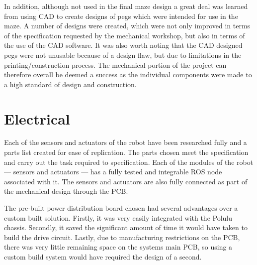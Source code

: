 In addition, although not used in the final maze design a great deal was learned from 
using CAD to create designs of pegs which were intended for use in the maze. A number 
of designs were created, which were not only improved in terms of the specification 
requested by the mechanical workshop, but also in terms of the use of the CAD 
software. It was also worth noting that the CAD designed pegs were not unusable 
because of a design flaw, but due to limitations in the printing/construction process. 
The mechanical portion of the project can therefore overall be deemed a success as 
the individual components were made to a high standard of design and construction. 

\section{Electrical}\label{eval/elec}
Each of the sensors and actuators of the robot have been researched fully and a 
parts list created for ease of replication. The parts chosen meet the 
specification and carry out the task required to specification. 
Each of the modules of the robot --- sensors and actuators --- has a fully 
tested and integrable ROS node associated with it. The sensors and actuators are 
also fully connected as part of the mechanical design through the PCB. 

The pre-built power distribution board chosen had several advantages over a 
custom built solution. Firstly, it was very easily integrated with the Polulu 
chassis. Secondly, it saved the significant amount of time it would have taken 
to build the drive circuit. Lastly, due to manufacturing restrictions on the PCB, 
there was very little remaining space on the systems main PCB, so using a custom 
build system would have required the design of a second. 

